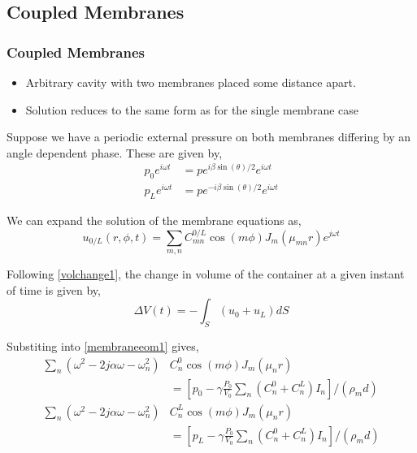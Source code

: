 \documentclass{beamer}
\begin{document}
\subsection{Coupled Membranes}

\begin{frame}
 \frametitle{Coupled Membranes}
 \begin{itemize}
  \item Arbitrary cavity with two membranes placed some distance apart.
  \item Solution reduces to the same form as for the single membrane case
 \end{itemize}

\end{frame}

\begin{frame}
 Suppose we have a periodic external pressure on both membranes differing by an
 angle dependent phase. These are given by,
 \begin{align}
  p_0e^{i\omega t}&=pe^{i\beta\sin(\theta)/2}e^{i\omega t}\\
  p_Le^{i\omega t}&=pe^{-i\beta\sin(\theta)/2}e^{i\omega t}
 \end{align}
 \end{frame}
 
 \begin{frame}
 We can expand the solution of the membrane equations as,
 \begin{equation}
  u_{0/L}(r,\phi,t)=\sum_{m,n}C^{0/L}_{mn}\cos(m\phi)J_m(\mu_{mn}r)e^{j\omega t}
 \end{equation}
 
 Following \eqref{volchange1}, the change in volume of the container at a given instant of time is given by,
 \begin{equation}
  \Delta V(t)=-\int_S(u_0+u_L)dS
 \end{equation}

\end{frame}

\begin{frame}
 Substiting into \eqref{membraneeom1} gives,
 \begin{align}
  \sum_{n}(\omega^2-2j\alpha\omega-\omega^2_{n})&C^0_n\cos(m\phi)J_m(\mu_{n}r)\nonumber\\
  &=\left[p_0-\gamma\frac{P_0}{V_0}\sum_{n}\left(C^0_{n}+C^L_{n}\right) I_{n}\right]/(\rho_md)\\
  \sum_{n}(\omega^2-2j\alpha\omega-\omega^2_{n})&C^L_{n}\cos(m\phi)J_m(\mu_{n}r)\nonumber\\
  &=\left[p_L-\gamma\frac{P_0}{V_0}\sum_{n}\left(C^0_{n}+C^L_{n}\right) I_{n}\right]/(\rho_md)
 \end{align}
\end{frame}
\end{document}
